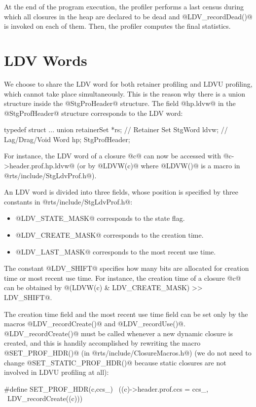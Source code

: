 \documentclass{article}
\begin{document}
At the end of the program execution, the profiler performs a last census during
which all closures in the heap are declared to be dead and @LDV_recordDead()@
is invoked on each of them. 
Then, the profiler computes the final statistics. 

\section{LDV Words}

We choose to share the LDV word for both retainer profiling and LDVU 
profiling, which cannot take place simultaneously. 
This is the reason why there is a
union structure inside the @StgProHeader@ structure.
The field @hp.ldvw@ in the @StgProfHeader@ structure corresponds to the LDV 
word:
\begin{code}
typedef struct {
  ...
  union {
    retainerSet *rs;          // Retainer Set
    StgWord ldvw;             // Lag/Drag/Void Word
  } hp;
} StgProfHeader;
\end{code}
For instance, the LDV word of a closure @c@ can now be accessed with 
@c->header.prof.hp.ldvw@ (or by @LDVW(c)@ where @LDVW()@ is a macro in 
@rts/include/StgLdvProf.h@).

An LDV word is divided into three fields, whose position is specified
by three constants in @rts/include/StgLdvProf.h@:
\begin{itemize}
\item{@LDV_STATE_MASK@} corresponds to the state flag. 
\item{@LDV_CREATE_MASK@} corresponds to the creation time.
\item{@LDV_LAST_MASK@} corresponds to the most recent use time.
\end{itemize}
The constant @LDV_SHIFT@ specifies how many bits are allocated for 
creation time or most recent use time.
For instance, the creation time of a closure @c@ can be obtained by
@(LDVW(c) & LDV_CREATE_MASK) >> LDV_SHIFT@.

The creation time field and the most recent use time field can be set only by the 
macros @LDV_recordCreate()@ and @LDV_recordUse()@. 
@LDV_recordCreate()@ must be called whenever a new dynamic closure is created,
and this is handily accomplished by rewriting the macro @SET_PROF_HDR()@ 
(in @rts/include/ClosureMacros.h@) (we do not need to change @SET_STATIC_PROF_HDR()@
because static closures are not involved in LDVU profiling at all):

\begin{code}
#define SET_PROF_HDR(c,ccs_)            \
        ((c)->header.prof.ccs = ccs_,   \
        LDV_recordCreate((c)))
\end{code}
\end{document}
